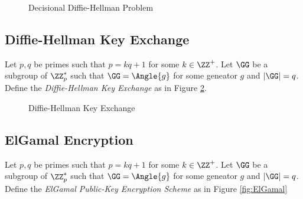 \documentclass[11pt,a4paper]{article}
\begin{document}
\begin{figure}[H]
\begin{pchstack}[ center , boxed, space=0.5cm]
\end{pchstack}
\caption{Decisional Diffie-Hellman Problem}
\label{fig:ddh}
\end{figure}



\subsection{Diffie-Hellman Key Exchange}
Let $p,q$ be primes such that $p = kq + 1$ for some $k \in \ZZ^+$. Let $\GG$ be a subgroup of $\ZZ_p^*$ such that $\GG = \Angle{g}$ for some geneator $g$ and $|\GG| = q$. Define the \textit{Diffie-Hellman Key Exchange} as in Figure \ref{fig:dhke}.


\begin{figure}[H]
\begin{pchstack}
\end{pchstack}
\caption{Diffie-Hellman Key Exchange}
\label{fig:dhke}
\end{figure}



\subsection{ElGamal Encryption}
Let $p,q$ be primes such that $p = kq + 1$ for some $k \in \ZZ^+$. Let $\GG$ be a subgroup of $\ZZ_p^*$ such that $\GG = \Angle{g}$ for some geneator $g$ and $|\GG| = q$. Define the \textit{ElGamal Public-Key Encryption Scheme} as in Figure \ref{fig:ElGamal}
\end{document}
